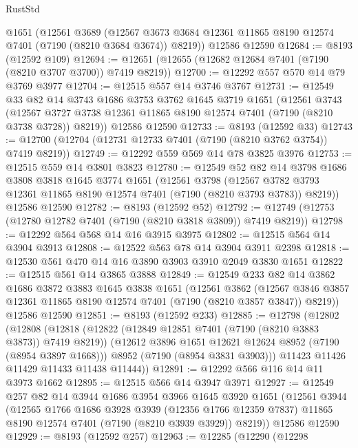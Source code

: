 \begin{lexlean}{RustStd}
\begin{coremodule}
    @1651
    (@12561
      @3689
      (@12567 @3673 @3684 @12361 @11865 @8190 @12574 @7401 (@7190 (@8210 @3684 @3674)) @8219))
    @12586
    @12590
@12684 := @8193 (@12592 @109)
@12694 := @12651 (@12655 (@12682 @12684 @7401 (@7190 (@8210 @3707 @3700)) @7419 @8219))
@12700 := @12292 @557 @570 @14 @79 @3769 @3977
@12704 := @12515 @557 @14 @3746 @3767
@12731 := @12549
    @33
    @82
    @14
    @3743
    @1686
    @3753
    @3762
    @1645
    @3719
    @1651
    (@12561
      @3743
      (@12567 @3727 @3738 @12361 @11865 @8190 @12574 @7401 (@7190 (@8210 @3738 @3728)) @8219))
    @12586
    @12590
@12733 := @8193 (@12592 @33)
@12743 := @12700 (@12704 (@12731 @12733 @7401 (@7190 (@8210 @3762 @3754)) @7419 @8219))
@12749 := @12292 @559 @569 @14 @78 @3825 @3976
@12753 := @12515 @559 @14 @3801 @3823
@12780 := @12549
    @52
    @82
    @14
    @3798
    @1686
    @3808
    @3818
    @1645
    @3774
    @1651
    (@12561
      @3798
      (@12567 @3782 @3793 @12361 @11865 @8190 @12574 @7401 (@7190 (@8210 @3793 @3783)) @8219))
    @12586
    @12590
@12782 := @8193 (@12592 @52)
@12792 := @12749 (@12753 (@12780 @12782 @7401 (@7190 (@8210 @3818 @3809)) @7419 @8219))
@12798 := @12292 @564 @568 @14 @16 @3915 @3975
@12802 := @12515 @564 @14 @3904 @3913
@12808 := @12522 @563 @78 @14 @3904 @3911 @2398
@12818 := @12530 @561 @470 @14 @16 @3890 @3903 @3910 @2049 @3830 @1651
@12822 := @12515 @561 @14 @3865 @3888
@12849 := @12549
    @233
    @82
    @14
    @3862
    @1686
    @3872
    @3883
    @1645
    @3838
    @1651
    (@12561
      @3862
      (@12567 @3846 @3857 @12361 @11865 @8190 @12574 @7401 (@7190 (@8210 @3857 @3847)) @8219))
    @12586
    @12590
@12851 := @8193 (@12592 @233)
@12885 := @12798
    (@12802
      (@12808
        (@12818
          (@12822 (@12849 @12851 @7401 (@7190 (@8210 @3883 @3873)) @7419 @8219))
          (@12612 @3896 @1651 @12621 @12624 @8952 (@7190 (@8954 @3897 @1668)))
          @8952
          (@7190 (@8954 @3831 @3903)))
        @11423
        @11426
        @11429
        @11433
        @11438
        @11444))
@12891 := @12292 @566 @116 @14 @11 @3973 @1662
@12895 := @12515 @566 @14 @3947 @3971
@12927 := @12549
    @257
    @82
    @14
    @3944
    @1686
    @3954
    @3966
    @1645
    @3920
    @1651
    (@12561
      @3944
      (@12565
        @1766
        @1686
        @3928
        @3939
        (@12356 @1766 @12359 @7837)
        @11865
        @8190
        @12574
        @7401
        (@7190 (@8210 @3939 @3929))
        @8219))
    @12586
    @12590
@12929 := @8193 (@12592 @257)
@12963 := @12285
    (@12290
      (@12298

\end{coremodule}
\end{lexlean}
